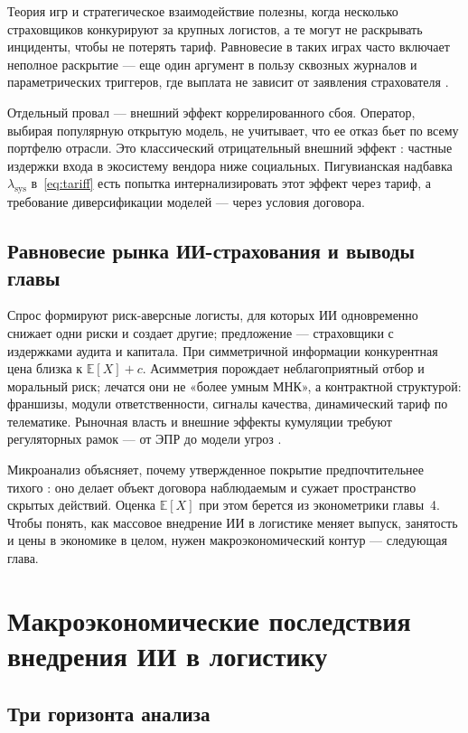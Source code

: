 \documentclass[a4paper,14pt]{extarticle}
\begin{document}
Теория игр и стратегическое взаимодействие \cite{pindyck} полезны, когда несколько страховщиков конкурируют за крупных логистов, а те могут не раскрывать инциденты, чтобы не потерять тариф. Равновесие в таких играх часто включает неполное раскрытие --- еще один аргумент в пользу сквозных журналов и параметрических триггеров, где выплата не зависит от заявления страхователя \cite{insurtech}.

Отдельный провал --- внешний эффект коррелированного сбоя. Оператор, выбирая популярную открытую модель, не учитывает, что ее отказ бьет по всему портфелю отрасли. Это классический отрицательный внешний эффект \cite{pindyck}: частные издержки входа в экосистему вендора ниже социальных. Пигувианская надбавка $\lambda_{\mathrm{sys}}$ в~\eqref{eq:tariff} есть попытка интернализировать этот эффект через тариф, а требование диверсификации моделей --- через условия договора.

\subsection{Равновесие рынка ИИ-страхования и выводы главы}

Спрос формируют риск-аверсные логисты, для которых ИИ одновременно снижает одни риски и создает другие; предложение --- страховщики с издержками аудита и капитала. При симметричной информации конкурентная цена близка к $\mathbb{E}[X]+c$. Асимметрия порождает неблагоприятный отбор и моральный риск; лечатся они не «более умным МНК», а контрактной структурой: франшизы, модули ответственности, сигналы качества, динамический тариф по телематике. Рыночная власть и внешние эффекты кумуляции требуют регуляторных рамок --- от ЭПР \cite{fz169} до модели угроз \cite{cbr}.

Микроанализ объясняет, почему утвержденное покрытие предпочтительнее тихого \cite{zezina, maglinova}: оно делает объект договора наблюдаемым и сужает пространство скрытых действий. Оценка $\mathbb{E}[X]$ при этом берется из эконометрики главы~4. Чтобы понять, как массовое внедрение ИИ в логистике меняет выпуск, занятость и цены в экономике в целом, нужен макроэкономический контур --- следующая глава.

\section{Макроэкономические последствия внедрения ИИ в логистику}

\subsection{Три горизонта анализа}
\end{document}
